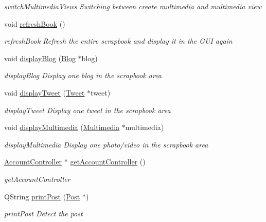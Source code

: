 \begin{DoxyCompactItemize}
\begin{DoxyCompactList}\small\item\em switch\+Multimedia\+Views Switching between create multimedia and multimedia view \end{DoxyCompactList}\item 
void \hyperlink{classScrapbookGUI_a5454d89263cb161a99f286d3dc3180e3}{refresh\+Book} ()\hypertarget{classScrapbookGUI_a5454d89263cb161a99f286d3dc3180e3}{}\label{classScrapbookGUI_a5454d89263cb161a99f286d3dc3180e3}

\begin{DoxyCompactList}\small\item\em refresh\+Book Refresh the entire scrapbook and display it in the G\+UI again \end{DoxyCompactList}\item 
void \hyperlink{classScrapbookGUI_a841087a66434703d3527690ac58f016a}{display\+Blog} (\hyperlink{classBlog}{Blog} $\ast$blog)
\begin{DoxyCompactList}\small\item\em display\+Blog Display one blog in the scrapbook area \end{DoxyCompactList}\item 
void \hyperlink{classScrapbookGUI_ae64992466cfed4643b4748ab936ed051}{display\+Tweet} (\hyperlink{classTweet}{Tweet} $\ast$tweet)
\begin{DoxyCompactList}\small\item\em display\+Tweet Display one tweet in the scrapbook area \end{DoxyCompactList}\item 
void \hyperlink{classScrapbookGUI_a1ac7e2138b02ba90ec63e55ec869bfa3}{display\+Multimedia} (\hyperlink{classMultimedia}{Multimedia} $\ast$multimedia)
\begin{DoxyCompactList}\small\item\em display\+Multimedia Display one photo/video in the scrapbook area \end{DoxyCompactList}\item 
\hyperlink{classAccountController}{Account\+Controller} $\ast$ \hyperlink{classScrapbookGUI_a7f8bae762c60a3afd37cec494579ba8f}{get\+Account\+Controller} ()
\begin{DoxyCompactList}\small\item\em get\+Account\+Controller \end{DoxyCompactList}\item 
Q\+String \hyperlink{classScrapbookGUI_a106ea2561d04306702d7c8279c18c8c2}{print\+Post} (\hyperlink{classPost}{Post} $\ast$)
\begin{DoxyCompactList}\small\item\em print\+Post Detect the post \end{DoxyCompactList}\end{DoxyCompactItemize}


